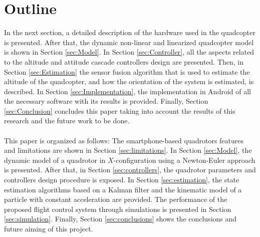 \section{Outline}
In the next section, a detailed description of the hardware used in the quadcopter is presented. After that, the dynamic non-linear and linearized quadcopter model is shown in Section \ref{sec:Model}. In Section \ref{sec:Controller}, all the aspects related to the altitude and attitude cascade controllers design are presented.
Then, in Section \ref{sec:Estimation} the sensor fusion algorithm that is used to estimate the altitude of the quadcopter, and how the orientation of the system is estimated, is described. In Section \ref{sec:Implementation}, the implementation in Android of all the necessary software with its results is provided. Finally, Section \ref{sec:Conclusion} concludes this paper taking into account the results of this research and the future work to be done.
\\\\
This paper is organized as follows: The smartphone-based quadrotors features and limitations are shown in Section \ref{sec:limitations}. In Section \ref{sec:Model}, the dynamic model of a quadrotor in $X$-configuration using a Newton-Euler approach is presented. After that, in Section \ref{sec:controllers}, the quadrotor parameters and controllers design procedure is exposed. In Section \ref{sec:estimation}, the state estimation algorithms based on a Kalman filter and the kinematic model of a particle with constant acceleration are provided. The performance of the proposed flight control system through simulations is presented in Section \ref{sec:simulation}. Finally, Section \ref{sec:conclusions} shows the conclusions and future aiming of this project.

